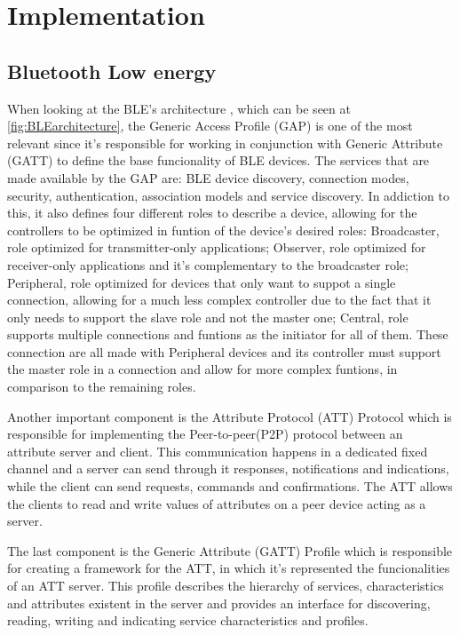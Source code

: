 \documentclass[a4paper]{IEEEtran}
\begin{document}
\section{Implementation}
\label{sec:struture}


\subsection{Bluetooth Low energy}
\label{ble}

When looking at the BLE's architecture , which can be seen at \ref{fig:BLEarchitecture}, the Generic Access Profile (GAP) is one of the most relevant since it's responsible for working in conjunction with Generic Attribute (GATT) to define the base funcionality of BLE devices. The services that are made available by the GAP are: BLE device discovery, connection modes, security, authentication, association models and service discovery.
In addiction to this, it also defines four different roles to describe a device, allowing for the controllers to be optimized in funtion of the device's desired roles: 
Broadcaster, role optimized for transmitter-only applications; 
Observer, role optimized for receiver-only applications and it's complementary to the broadcaster role;
Peripheral, role optimized for devices that only want to suppot a single connection, allowing for a much less complex controller due to the fact that it only needs to support the slave role and not the master one; 
Central, role supports multiple connections and funtions as the initiator for all of them. These connection are all made with Peripheral devices and its controller must support the master role in a connection and allow for more complex funtions, in comparison to the remaining roles.

Another important component is the Attribute Protocol (ATT) Protocol which is responsible for implementing the Peer-to-peer(P2P) protocol between an attribute server and client. This communication happens in a dedicated fixed  channel and a server can send through it responses, notifications and indications, while the client can send requests, commands and confirmations. The ATT allows the clients to read and write values of attributes on a peer device acting as a server.

The last component is the Generic Attribute (GATT) Profile which is responsible for creating a framework for the ATT, in which it's represented the funcionalities of an ATT server. This profile describes the hierarchy of services, characteristics and attributes existent in the server and provides an interface for discovering, reading, writing and indicating service characteristics and profiles.
\end{document}
